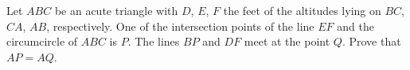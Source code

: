 Let $ABC$ be an acute triangle with $D$, $E$, $F$ the feet of the altitudes lying on $BC$, $CA$, $AB$, respectively. One of the intersection points of the line $EF$ and the circumcircle of $ABC$ is $P$. The lines $BP$ and $DF$ meet at the point $Q$. Prove that $AP=AQ$.

